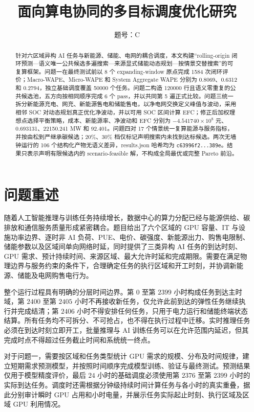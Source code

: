 \documentclass[withoutpreface,bwprint]{cumcmthesis}
\title{面向算电协同的多目标调度优化研究}
\author{题号：C}
\date{}
\begin{document}
\maketitle
\begin{abstract}
针对六区域异构 AI 任务与新能源、储能、电网的耦合调度，本文构建“rolling-origin 闭环预测—语义唯一公共候选多遍搜索—来源显式储能动态规划—按情景交替搜索”的可复算框架。问题一在最终测试前以 8 个 expanding-window 原点完成 1584 次闭环评价；Macro-WAPE、Micro-WAPE 和 System Aggregate WAPE 分别为 0.8069、0.6312 和 0.2794，独立基础调度覆盖 50000 个任务。问题二构造 120000 行且语义零重复的公共候选池，五方向按相同顺序完成 6 个 pass，并以共同第 5 遍正式比较。问题三统一拆分新能源充电、网充、新能源售电和储能售电，以净电网交换定义峰值与波动，采用相邻 SOC 对动态规划真正优化净波动，并以可用 SOC 区间计算 EFC；修正后加权理想点选择平衡策略，成本、新能源率、净波动和 EFC 分别为 $-4.541740\times10^8$ 元、0.693131、22150.241 MW 和 92.401。问题四对 17 个情景统一复算能源与服务指标，并按由松到严继承碳候选；20\%、30\% 档仅标记声明搜索内未找到达标候选。两次无墙钟运行的 106 个结构化产物无语义差异，results.json 哈希均为 \texttt{c63996f2...389e}。结果只表示声明有限候选内的 scenario-feasible 解，不构成全局最优或完整 Pareto 前沿。
\end{abstract}
\clearpage
\section{问题重述}

随着人工智能推理与训练任务持续增长，数据中心的算力分配已经与能源供给、碳排放和通信服务质量形成紧密耦合。题目给出了六个区域的 GPU 容量、IT 与设施功率边界、逐时非 AI 负荷、PUE、电价、碳强度、新能源出力、购售电限制、储能参数以及区域间单向网络时延，同时提供了三类异构 AI 任务的到达时刻、GPU 需求、预计持续时间、来源区域、最大允许时延和完成期限。需要在满足物理边界与服务约束的条件下，合理确定任务的执行区域和开工时刻，并协调新能源、储能及电网购售电行为。

整个运行过程具有明确的分层时间边界。第 $0$ 至第 $2399$ 小时构成任务到达主时域，第 $2400$ 至第 $2405$ 小时不再接收新任务，仅允许此前到达的弹性任务继续执行并完成结清；第 $2406$ 小时不得安排任何任务，只用于电力运行和储能终端状态结算。所有任务均不可拆分、不可抢占，也不得在执行过程中迁移。实时推理任务必须在到达时刻立即开工，批量推理与 AI 训练任务可以在允许范围内延迟，但其完成时点不得超过任务截止时间和系统统一终点。

对于问题一，需要按区域和任务类型统计 GPU 需求的规模、分布及时间规律，建立短期需求预测模型，并按照时间顺序完成模型训练、验证与最终测试。预测结果仅用于模型精度评价，最后 $24$ 小时的基础调度必须使用第 $2376$ 至第 $2399$ 小时的实际到达任务。调度时还需根据分钟级持续时间计算任务与各小时的真实重叠，据此分别审计瞬时 GPU 占用和小时电量，并展示任务实际起止时刻、执行区域及区域 GPU 利用情况。
\end{document}
